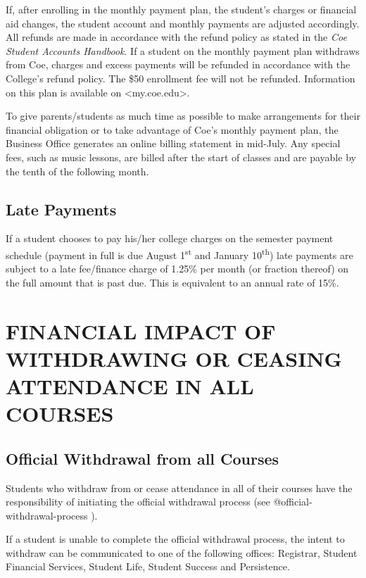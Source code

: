 \documentclass[
  letterpaper,
]{scrbook}
\begin{document}
If, after enrolling in the monthly payment plan, the student's charges
or financial aid changes, the student account and monthly payments are
adjusted accordingly. All refunds are made in accordance with the refund
policy as stated in the \emph{Coe Student Accounts Handbook}. If a
student on the monthly payment plan withdraws from Coe, charges and
excess payments will be refunded in accordance with the College's refund
policy. The \$50 enrollment fee will not be refunded. Information on
this plan is available on \textless my.coe.edu\textgreater.

To give parents/students as much time as possible to make arrangements
for their financial obligation or to take advantage of Coe's monthly
payment plan, the Business Office generates an online billing statement
in mid-July. Any special fees, such as music lessons, are billed after
the start of classes and are payable by the tenth of the following
month.

\subsection{Late Payments}\label{late-payments}

If a student chooses to pay his/her college charges on the semester
payment schedule (payment in full is due August 1\textsuperscript{st}
and January 10\textsuperscript{th}) late payments are subject to a late
fee/finance charge of 1.25\% per month (or fraction thereof) on the full
amount that is past due. This is equivalent to an annual rate of 15\%.

\section{FINANCIAL IMPACT OF WITHDRAWING OR CEASING ATTENDANCE IN ALL
COURSES}\label{financial-impact-of-withdrawing-or-ceasing-attendance-in-all-courses}

\subsection{Official Withdrawal from all
Courses}\label{official-withdrawal-from-all-courses}

Students who withdraw from or cease attendance in all of their courses
have the responsibility of initiating the official withdrawal process
(see @official-withdrawal-process ).

If a student is unable to complete the official withdrawal process, the
intent to withdraw can be communicated to one of the following offices:
Registrar, Student Financial Services, Student Life, Student Success and
Persistence.
\end{document}
